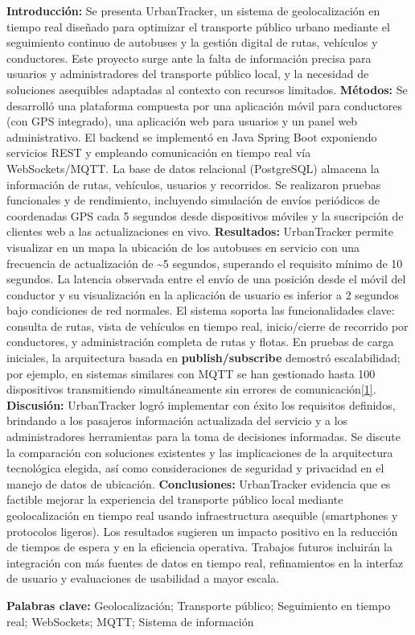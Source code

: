 \textbf{Introducción:} Se presenta UrbanTracker, un sistema de geolocalización en tiempo real diseñado para optimizar el transporte público urbano mediante el seguimiento continuo de autobuses y la gestión digital de rutas, vehículos y conductores. Este proyecto surge ante la falta de información precisa para usuarios y administradores del transporte público local, y la necesidad de soluciones asequibles adaptadas al contexto con recursos limitados. \textbf{Métodos:} Se desarrolló una plataforma compuesta por una aplicación móvil para conductores (con GPS integrado), una aplicación web para usuarios y un panel web administrativo. El backend se implementó en Java Spring Boot exponiendo servicios REST y empleando comunicación en tiempo real vía WebSockets/MQTT. La base de datos relacional (PostgreSQL) almacena la información de rutas, vehículos, usuarios y recorridos. Se realizaron pruebas funcionales y de rendimiento, incluyendo simulación de envíos periódicos de coordenadas GPS cada 5 segundos desde dispositivos móviles y la suscripción de clientes web a las actualizaciones en vivo. \textbf{Resultados:} UrbanTracker permite visualizar en un mapa la ubicación de los autobuses en servicio con una frecuencia de actualización de \textasciitilde5 segundos, superando el requisito mínimo de 10 segundos. La latencia observada entre el envío de una posición desde el móvil del conductor y su visualización en la aplicación de usuario es inferior a 2 segundos bajo condiciones de red normales. El sistema soporta las funcionalidades clave: consulta de rutas, vista de vehículos en tiempo real, inicio/cierre de recorrido por conductores, y administración completa de rutas y flotas. En pruebas de carga iniciales, la arquitectura basada en \textbf{publish/subscribe} demostró escalabilidad; por ejemplo, en sistemas similares con MQTT se han gestionado hasta 100 dispositivos transmitiendo simultáneamente sin errores de comunicación\href{https://fliphtml5.com/lqsof/cdpg/Art\%C3\%ADculos/\#:~:text=permitiendo\%20un\%20flujo\%20de\%20datos,del\%20sistema\%20fue\%20un\%20rigurosa}{{[}1{]}}. \textbf{Discusión:} UrbanTracker logró implementar con éxito los requisitos definidos, brindando a los pasajeros información actualizada del servicio y a los administradores herramientas para la toma de decisiones informadas. Se discute la comparación con soluciones existentes y las implicaciones de la arquitectura tecnológica elegida, así como consideraciones de seguridad y privacidad en el manejo de datos de ubicación. \textbf{Conclusiones:} UrbanTracker evidencia que es factible mejorar la experiencia del transporte público local mediante geolocalización en tiempo real usando infraestructura asequible (smartphones y protocolos ligeros). Los resultados sugieren un impacto positivo en la reducción de tiempos de espera y en la eficiencia operativa. Trabajos futuros incluirán la integración con más fuentes de datos en tiempo real, refinamientos en la interfaz de usuario y evaluaciones de usabilidad a mayor escala.

\textbf{Palabras clave:} Geolocalización; Transporte público; Seguimiento en tiempo real; WebSockets; MQTT; Sistema de información
